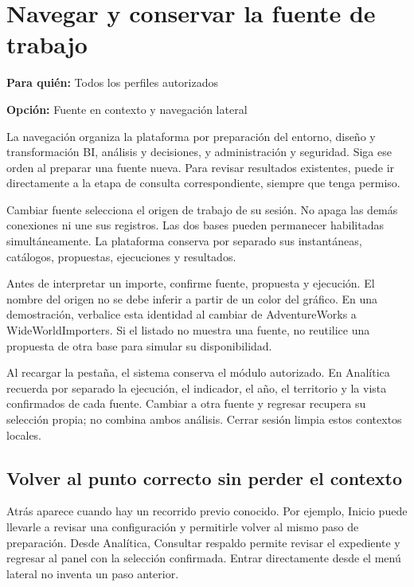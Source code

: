 \section{Navegar y conservar la fuente de trabajo}
\label{unidad:operacion_03}
\textbf{Para quién:} Todos los perfiles autorizados\par
\textbf{Opción:} Fuente en contexto y navegación lateral\par

La navegación organiza la plataforma por preparación del entorno, diseño y transformación BI, análisis y decisiones, y administración y seguridad. Siga ese orden al preparar una fuente nueva. Para revisar resultados existentes, puede ir directamente a la etapa de consulta correspondiente, siempre que tenga permiso.

Cambiar fuente selecciona el origen de trabajo de su sesión. No apaga las demás conexiones ni une sus registros. Las dos bases pueden permanecer habilitadas simultáneamente. La plataforma conserva por separado sus instantáneas, catálogos, propuestas, ejecuciones y resultados.

Antes de interpretar un importe, confirme fuente, propuesta y ejecución. El nombre del origen no se debe inferir a partir de un color del gráfico. En una demostración, verbalice esta identidad al cambiar de AdventureWorks a WideWorldImporters. Si el listado no muestra una fuente, no reutilice una propuesta de otra base para simular su disponibilidad.

Al recargar la pestaña, el sistema conserva el módulo autorizado. En Analítica recuerda por separado la ejecución, el indicador, el año, el territorio y la vista confirmados de cada fuente. Cambiar a otra fuente y regresar recupera su selección propia; no combina ambos análisis. Cerrar sesión limpia estos contextos locales.

\subsection{Volver al punto correcto sin perder el contexto}
Atrás aparece cuando hay un recorrido previo conocido. Por ejemplo, Inicio puede llevarle a revisar una configuración y permitirle volver al mismo paso de preparación. Desde Analítica, Consultar respaldo permite revisar el expediente y regresar al panel con la selección confirmada. Entrar directamente desde el menú lateral no inventa un paso anterior.

